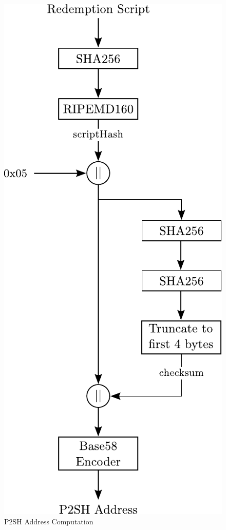 \begin{figure}[htbp]

\centering
\includegraphics[scale=0.9]{Images/BitcoinAddress-P2SH.pdf}

\vspace{10pt}
\caption{P2SH Address Computation}
\label{fig:BitcoinAddress-P2SH}
\end{figure}
\vspace{-10pt}


